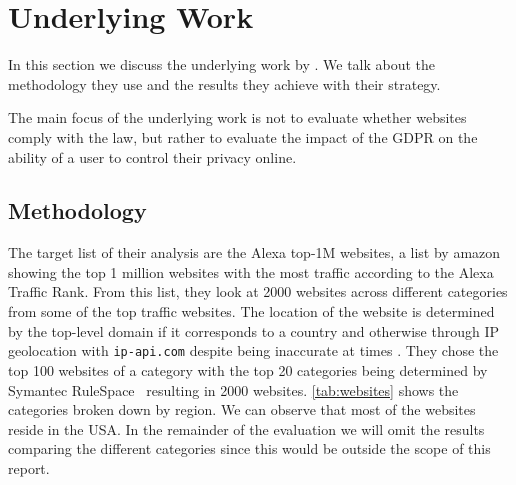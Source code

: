 \section{Underlying Work}
\label{sec:underlying}

In this section we discuss the underlying work by . We talk about the methodology they use and the
results they achieve with their strategy.

The main focus of the underlying work is not to evaluate whether websites comply with the law, but rather to evaluate
the impact of the GDPR on the ability of a user to control their privacy online.

\subsection{Methodology}
\label{subsec:methodology}

The target list of their analysis are the Alexa top-1M websites, a list by amazon showing the top 1 million websites with
the most traffic according to the Alexa Traffic Rank. From this list, they look at 2000 websites across different
categories from some of the top traffic websites. The location of the website is determined by the top-level domain 
if it corresponds to a country and otherwise through IP geolocation with \texttt{ip-api.com} despite being inaccurate at
times \cite{weinberg2018catch}. They chose the top 100 websites of a category with the top 20 categories being determined
by Symantec RuleSpace~\cite{symantec} resulting in 2000 websites. \autoref{tab:websites} shows the categories broken
down by region. We can observe that most of the websites reside in the USA. In the remainder of the evaluation we will omit the
results comparing the different categories since this would be outside the scope of this report.

